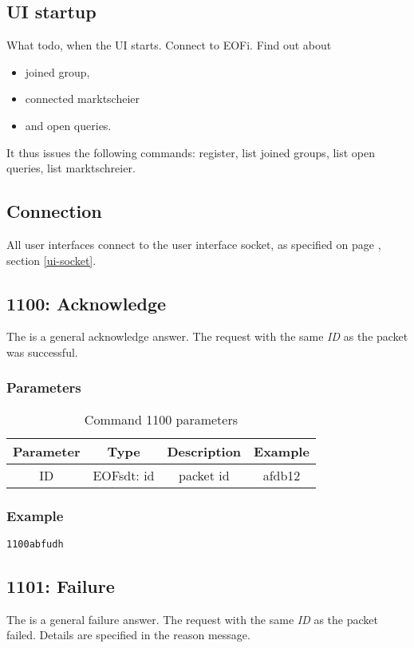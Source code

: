 \documentclass[12pt,a4paper]{book}
\begin{document}
\subsection{UI startup}
What todo, when the UI starts.
Connect to EOFi. Find out about
\begin{itemize}
\item joined group,
\item connected marktscheier
\item and open queries.
\end{itemize}
It thus issues the following commands:
register, list joined groups, list open queries, list marktschreier.
\subsection{Connection}
All user interfaces connect to the user interface socket, as specified
on page \pageref{ui-socket}, section \ref{ui-socket}.
\subsection{1100: Acknowledge}
The is a general acknowledge answer. The request with the
same \emph{ID} as the packet was successful.
\subsubsection{Parameters}
\begin{longtable}{|c|c|c|c|}
\caption{Command 1100 parameters}\\
\hline
\textbf{Parameter} & \textbf{Type} & \textbf{Description} & \textbf{Example}\\
\hline
ID & EOFsdt: id & packet id & afdb12\\
\hline
\end{longtable}
\subsubsection{Example}
\begin{verbatim}
1100abfudh
\end{verbatim}
\subsection{1101: Failure}
The is a general failure answer. The request with the
same \emph{ID} as the packet failed.
Details are specified in the reason message.
\end{document}
